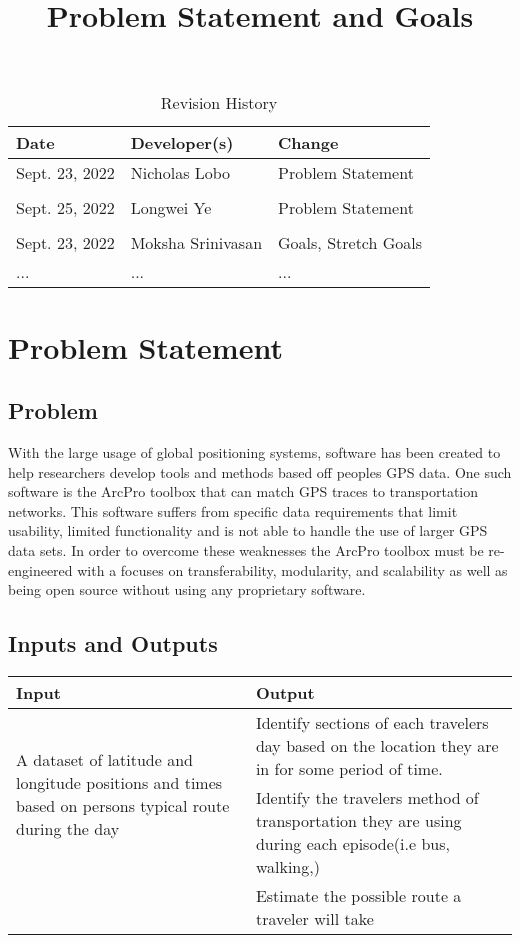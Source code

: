 \documentclass{article}
\title{Problem Statement and Goals\\\progname}
\author{\authname}
\date{}
\begin{document}
\maketitle

\begin{table}[hp]
\caption{Revision History} \label{TblRevisionHistory}
\begin{tabularx}{\textwidth}{llX}
\toprule
\textbf{Date} & \textbf{Developer(s)} & \textbf{Change}\\
\midrule
Sept. 23, 2022 & Nicholas Lobo & Problem Statement\\\\
Sept. 25, 2022 & Longwei Ye    & Problem Statement\\\\
Sept. 23, 2022 & Moksha Srinivasan & Goals, Stretch Goals\\
... & ... & ...\\
\bottomrule
\end{tabularx}
\end{table}

\section{Problem Statement}



\subsection{Problem}
With the large usage of global positioning systems, software has been created to help researchers develop tools and methods based off peoples GPS data. 
One such software is the ArcPro toolbox that can match GPS traces to transportation networks. This software suffers from specific data requirements that limit usability, 
limited functionality and is not able to handle the use of larger GPS data sets. In order to overcome these weaknesses the ArcPro toolbox must be re-engineered with a focuses 
on transferability, modularity, and scalability as well as being open source without using any proprietary software. 

\subsection{Inputs and Outputs}
\begin{table}[h]
    \centering
    \begin{tabular}{|p{6cm}|p{6cm}|}
    \hline
    Input & Output  \\
    \hline
    \multirow{2}{5cm}{A dataset of latitude and longitude positions and times based on persons typical route during the day} & Identify sections of each travelers day based on the location they are in for some period of time.  \\\cline{2-2} 
    & Identify the travelers method of transportation they are using during each episode(i.e bus, walking,)  \\\cline{2-2} 
    & Estimate the possible route a traveler will take\\\cline{2-2} 
    \hline
    \end{tabular}
\end{table}
\end{document}
